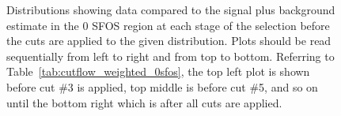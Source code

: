 \begin{figure}[ht!]
\caption{Distributions showing data compared to the signal plus background estimate in the 0 SFOS region at each stage 
of the selection before the cuts are applied to the given distribution. 
Plots should be read sequentially from left to right
and from top to bottom. 
Referring to Table~\ref{tab:cutflow_weighted_0sfos}, the top left
plot is shown before cut \#3 is applied, top middle is before cut \#5, and
so on until the bottom right which is after all cuts are applied.
}
\label{fig:0sfos}
\end{figure}

\clearpage
